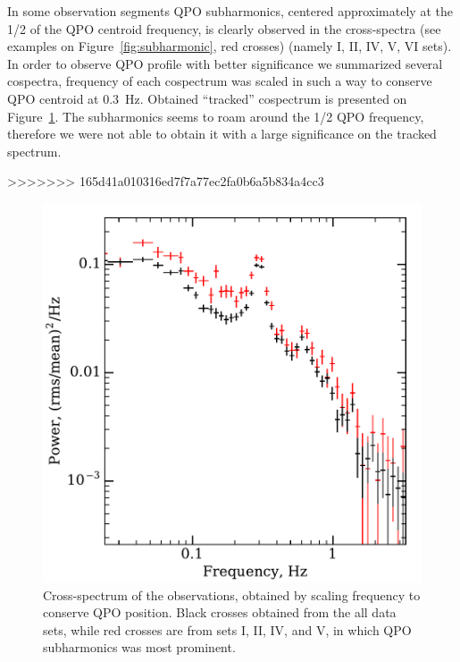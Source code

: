 \documentclass[a4paper,fleqn,usenatbib]{mnras}
\begin{document}
In some observation segments QPO subharmonics, centered approximately at the 1/2 of the QPO centroid frequency, is clearly observed in the cross-spectra (see examples on Figure~\ref{fig:subharmonic}, red crosses) (namely I, II, IV, V, VI sets).
In order to observe QPO profile with better significance we summarized several cospectra, frequency of each cospectrum was scaled in such a way to conserve QPO centroid at 0.3~Hz.
Obtained ``tracked'' cospectrum is presented on Figure~\ref{fig:cospec_tracked}.
The subharmonics seems to roam around the 1/2 QPO frequency, therefore we were not able to obtain it with a large significance on the tracked spectrum.

>>>>>>> 165d41a010316ed7f7a77ec2fa0b6a5b834a4cc3

\begin{figure}
        \includegraphics[width=\columnwidth]{folded_cospectr2.pdf}
        \caption{Cross-spectrum of the observations, obtained by scaling frequency to conserve QPO position.
        Black crosses obtained from the all data sets, while red crosses are from sets I, II, IV, and V, in which QPO subharmonics was most prominent.}
        \label{fig:cospec_tracked}
\end{figure}
\end{document}

